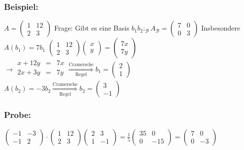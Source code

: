 \subsubsection{Beispiel:}
$A=\begin{pmatrix} 1 & 12 \\ 2 & 3 \end{pmatrix}$ Frage: Gibt es eine Basis $b_{1}b_{2}: _{\mathcal{B}}A_{\mathcal{B}} = \begin{pmatrix} 7 & 0 \\ 0 & 3 \end{pmatrix}$ Insbesondere $A(b_{1})=7b_{1}$  $\begin{pmatrix}1 & 12 \\ 2 & 3 \end{pmatrix} \begin{pmatrix} x \\ y \end{pmatrix} = \begin{pmatrix} 7x \\ 7y \end{pmatrix}$ \\
$\rightarrow
\begin{array}{rcr}
x + 12y &=& 7x\\
2x + 3y &=& 7y\\
\end{array}
\mathop{\Rightarrow}\limits^{\text{Cramersche}}_{\text{Regel}} b_{1} = \begin{pmatrix} 2 \\ 1 \end{pmatrix}$\\
$A(b_{2}) = -3b_{2} \mathop{\Rightarrow}\limits^{\text{Cramersche}}_{\text{Regel}} b_{2} = \begin{pmatrix} 3 \\ -1 \end{pmatrix}$\\
%
%
%
\subsubsection{Probe:}
$\begin{pmatrix} -1 & -3 \\ -1 & 2 \end{pmatrix} \cdot \begin{pmatrix} 1 & 12 \\ 2 & 3 \end{pmatrix} \begin{pmatrix}2 & 3 \\ 1 & -1 \end{pmatrix} = \frac{1}{5} \begin{pmatrix} 35 & 0 \\ 0 & -15 \end{pmatrix} = \begin{pmatrix} 7 & 0 \\ 0 & -3 \end{pmatrix}$
%
%
%
